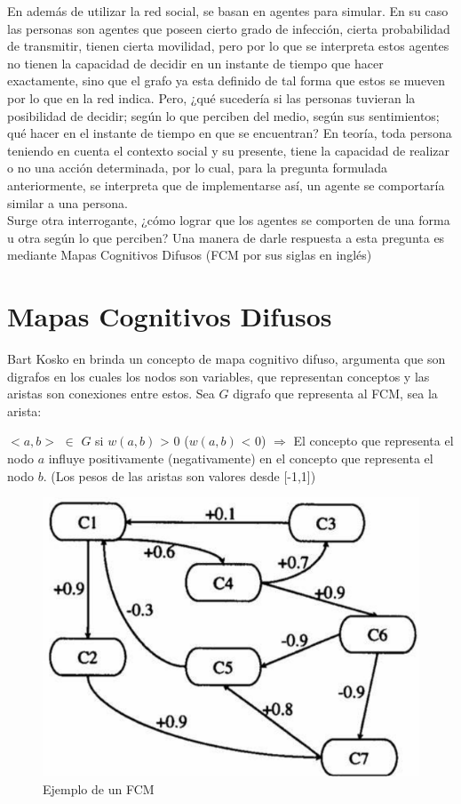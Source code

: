 En \autocite{Bissett2021} 
además de utilizar la red social, se basan en agentes para simular. En su caso las personas son agentes que 
poseen cierto grado de infección, cierta probabilidad de transmitir, tienen cierta movilidad, pero por lo 
que se interpreta estos agentes no tienen la capacidad de decidir en un instante de tiempo que hacer exactamente, 
sino que el grafo ya esta definido  de tal forma que estos se mueven por lo que en la red indica. Pero, ¿qué 
sucedería si las personas tuvieran la posibilidad de decidir; según lo que perciben del medio, según sus sentimientos; 
qué hacer en el instante de tiempo en que se encuentran? En teoría, toda persona teniendo en cuenta el 
contexto social y su presente, tiene la capacidad de realizar o no una acción determinada, por lo cual, para la pregunta 
formulada anteriormente, se interpreta que de implementarse así, un agente se comportaría similar a una persona.\\ 
Surge otra interrogante, ¿cómo lograr que los agentes se comporten de una forma u otra según lo que perciben? Una manera 
de darle respuesta a esta pregunta es mediante Mapas Cognitivos Difusos (FCM por sus siglas en inglés) 


\section{Mapas Cognitivos Difusos}
Bart Kosko en \autocite{Bart1986}
brinda un concepto de mapa cognitivo difuso, argumenta que son digrafos en los cuales los nodos son variables,
que representan conceptos y las aristas son conexiones entre estos. Sea $G$ digrafo que representa al FCM, 
sea la arista:
\begin{center}
    $<a,b>$ $\in$ $G$ si $w(a,b)$ > $0$  ($w(a,b)$ < $0$) $\Rightarrow$ El concepto que representa el nodo $a$ influye 
    positivamente (negativamente) en el concepto que representa el nodo $b$. (Los pesos de las aristas son valores desde 
    [-1,1])  
\end{center}
\begin{figure}[htb]
    \centering
    \includegraphics{Graphics/fcm_example.png}
    \caption{Ejemplo de un FCM}
\end{figure}

